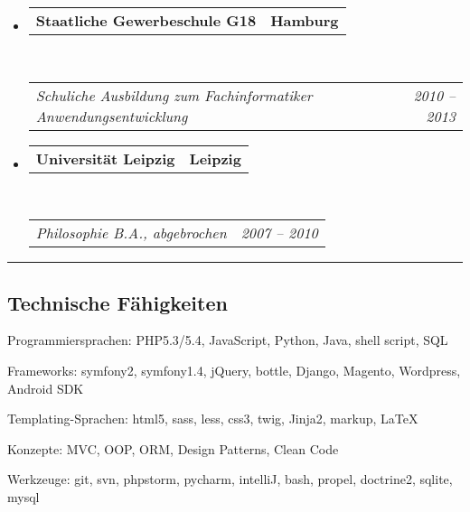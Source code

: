 \documentclass[10pt,letterpaper]{article}
\makeatletter
\newenvironment{indentsection}[1]%
{\begin{list}{}%
	{\setlength{\leftmargin}{#1}}%
	\item[]%
}
{\end{list}}
\newcommand{\headerrow}[2]
{\begin{tabular*}{\linewidth}{l@{\extracolsep{\fill}}r}
	#1 &
	#2 \\
\end{tabular*}}
\makeatother
\begin{document}
\begin{itemize}
	\parskip=0.1em

	\item 
	\headerrow
		{\textbf{Staatliche Gewerbeschule G18}}
		{\textbf{Hamburg}}
	\\
	\headerrow
		{\emph{Schuliche Ausbildung zum Fachinformatiker Anwendungsentwicklung}}
		{\emph{2010 -- 2013}}
	
	
		\item 
	\headerrow
		{\textbf{Universität Leipzig}}
		{\textbf{Leipzig}}
	\\
	\headerrow
		{\emph{Philosophie B.A., abgebrochen}}
		{\emph{2007 -- 2010}}





\end{itemize}

\hrule
\vspace{-0.4em}
\subsection*{Technische Fähigkeiten}

\begin{indentsection}{\parindent}
\begin{description*}
	\item[Programmiersprachen:]
    PHP5.3/5.4, JavaScript, Python, Java, shell script, SQL
	\item[Frameworks:]
	  symfony2, symfony1.4, jQuery, bottle, Django, Magento, Wordpress, Android SDK
	\item[Templating-Sprachen:]
	  html5, sass, less, css3, twig, Jinja2, markup, \LaTeX
	\item[Konzepte:]
	  MVC, OOP, ORM, Design Patterns, Clean Code
  \item[Werkzeuge:]
    git, svn, phpstorm, pycharm, intelliJ, bash, propel, doctrine2, sqlite, mysql
\end{description*}
\end{indentsection}
\end{document}
